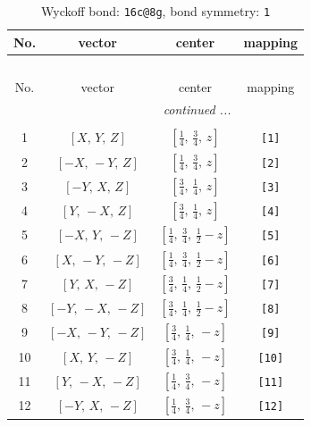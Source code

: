 \documentclass[fleqn,8pt]{jsarticle}
\begin{document}
\begin{longtable}{cccc}
\caption{Wyckoff bond: {\tt 16c@8g}, bond symmetry: {\tt 1}}
 \\
 \hline \hline
No. & vector & center & mapping \\ \hline \endfirsthead

\multicolumn{3}{l}{\tablename\ \thetable{}} \\
 \hline \hline
No. & vector & center & mapping \\ \hline \endhead

 \hline \hline
\multicolumn{3}{r}{\footnotesize\it continued ...} \\ \endfoot

 \hline \hline
\multicolumn{3}{r}{} \\ \endlastfoot

1 & $\left[ X,\, Y,\, Z \right]$ & $\left[ \frac{1}{4},\, \frac{3}{4},\, z \right]$ & {\tt [1]} \\ \hline
2 & $\left[ - X,\, - Y,\, Z \right]$ & $\left[ \frac{1}{4},\, \frac{3}{4},\, z \right]$ & {\tt [2]} \\ \hline
3 & $\left[ - Y,\, X,\, Z \right]$ & $\left[ \frac{3}{4},\, \frac{1}{4},\, z \right]$ & {\tt [3]} \\ \hline
4 & $\left[ Y,\, - X,\, Z \right]$ & $\left[ \frac{3}{4},\, \frac{1}{4},\, z \right]$ & {\tt [4]} \\ \hline
5 & $\left[ - X,\, Y,\, - Z \right]$ & $\left[ \frac{1}{4},\, \frac{3}{4},\, \frac{1}{2} - z \right]$ & {\tt [5]} \\ \hline
6 & $\left[ X,\, - Y,\, - Z \right]$ & $\left[ \frac{1}{4},\, \frac{3}{4},\, \frac{1}{2} - z \right]$ & {\tt [6]} \\ \hline
7 & $\left[ Y,\, X,\, - Z \right]$ & $\left[ \frac{3}{4},\, \frac{1}{4},\, \frac{1}{2} - z \right]$ & {\tt [7]} \\ \hline
8 & $\left[ - Y,\, - X,\, - Z \right]$ & $\left[ \frac{3}{4},\, \frac{1}{4},\, \frac{1}{2} - z \right]$ & {\tt [8]} \\ \hline
9 & $\left[ - X,\, - Y,\, - Z \right]$ & $\left[ \frac{3}{4},\, \frac{1}{4},\, - z \right]$ & {\tt [9]} \\ \hline
10 & $\left[ X,\, Y,\, - Z \right]$ & $\left[ \frac{3}{4},\, \frac{1}{4},\, - z \right]$ & {\tt [10]} \\ \hline
11 & $\left[ Y,\, - X,\, - Z \right]$ & $\left[ \frac{1}{4},\, \frac{3}{4},\, - z \right]$ & {\tt [11]} \\ \hline
12 & $\left[ - Y,\, X,\, - Z \right]$ & $\left[ \frac{1}{4},\, \frac{3}{4},\, - z \right]$ & {\tt [12]} \\ \hline

\end{longtable}
\end{document}
